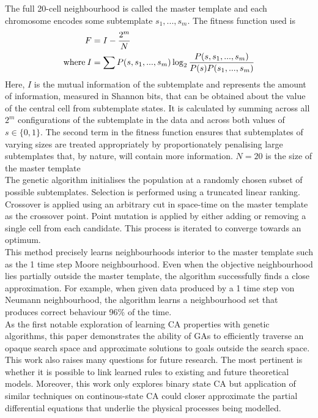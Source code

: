 The full 20-cell neighbourhood is called the master template and each chromosome encodes some subtemplate ${s_1, ..., s_m}$. The fitness function used is
\begin{align*}
                    F &= I - \frac{2^m}{N}\\
    \text{where\:}  I &= \sum P(s, s_1, ..., s_m)\log_2{\frac{P(s, s_1, ..., s_m)}{P(s)P(s_1, ..., s_m)}}
\end{align*}
Here, $I$ is the mutual information of the subtemplate and represents the amount of information, measured in Shannon bits, that can be obtained about the value of the central cell from subtemplate states. It is calculated by summing across all $2^m$ configurations of the subtemplate in the data and across both values of $s \in \{0,1\}$. The second term in the fitness function ensures that subtemplates of varying sizes are treated appropriately by proportionately penalising large subtemplates that, by nature, will contain more information. $N=20$ is the size of the master template\\

The genetic algorithm initialises the population at a randomly chosen subset of possible subtemplates. Selection is performed using a truncated linear ranking. Crossover is applied using an arbitrary cut in space-time on the master template as the crossover point. Point mutation is applied by either adding or removing a single cell from each candidate. This process is iterated to converge towards an optimum.\\

This method precisely learns neighbourhoods interior to the master template such as the 1 time step Moore neighbourhood. Even when the objective neighbourhood lies partially outside the master template, the algorithm successfully finds a close approximation. For example, when given data produced by a 1 time step von Neumann neighbourhood, the algorithm learns a neighbourhood set that produces correct behaviour 96\% of the time.\\

As the first notable exploration of learning CA properties with genetic algorithms, this paper demonstrates the ability of GAs to efficiently traverse an opaque search space and approximate solutions to goals outside the search space.\\

This work also raises many questions for future research. The most pertinent is whether it is possible to link learned rules to existing and future theoretical models. Moreover, this work only explores binary state CA but application of similar techniques on continous-state CA could closer approximate the partial differential equations that underlie the physical processes being modelled.\\

